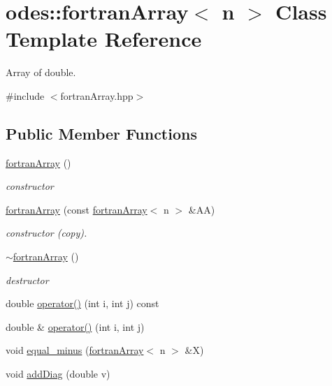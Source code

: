 \hypertarget{classodes_1_1fortranArray}{\section{odes\-:\-:fortran\-Array$<$ n $>$ Class Template Reference}
\label{classodes_1_1fortranArray}
}


Array of double.  




{\ttfamily \#include $<$fortran\-Array.\-hpp$>$}

\subsection*{Public Member Functions}
\begin{DoxyCompactItemize}
\item 
\hyperlink{classodes_1_1fortranArray_a8df00fb51f372f5094232edcef336c3f}{fortran\-Array} ()
\begin{DoxyCompactList}\small\item\em constructor \end{DoxyCompactList}\item 
\hyperlink{classodes_1_1fortranArray_a6497db7c1e408bf8888e29ed142fda94}{fortran\-Array} (const \hyperlink{classodes_1_1fortranArray}{fortran\-Array}$<$ n $>$ \&A\-A)
\begin{DoxyCompactList}\small\item\em constructor (copy). \end{DoxyCompactList}\item 
\hyperlink{classodes_1_1fortranArray_ac70234541156d66bceb76a914f7d7970}{$\sim$fortran\-Array} ()
\begin{DoxyCompactList}\small\item\em destructor \end{DoxyCompactList}\item 
double \hyperlink{classodes_1_1fortranArray_a8da3208d04c048239fc3a8584090d2da}{operator()} (int i, int j) const 
\item 
double \& \hyperlink{classodes_1_1fortranArray_a8c8bbde9344a64c1c3a26b30f1a6d56f}{operator()} (int i, int j)
\item 
void \hyperlink{classodes_1_1fortranArray_a2ee01351fbf74c6f7b5d158ee16c84a0}{equal\-\_\-minus} (\hyperlink{classodes_1_1fortranArray}{fortran\-Array}$<$ n $>$ \&X)
\item 
void \hyperlink{classodes_1_1fortranArray_a5ada5ca2fd55f5e5dfb339de35b9f5ad}{add\-Diag} (double v)

\end{DoxyCompactItemize}
